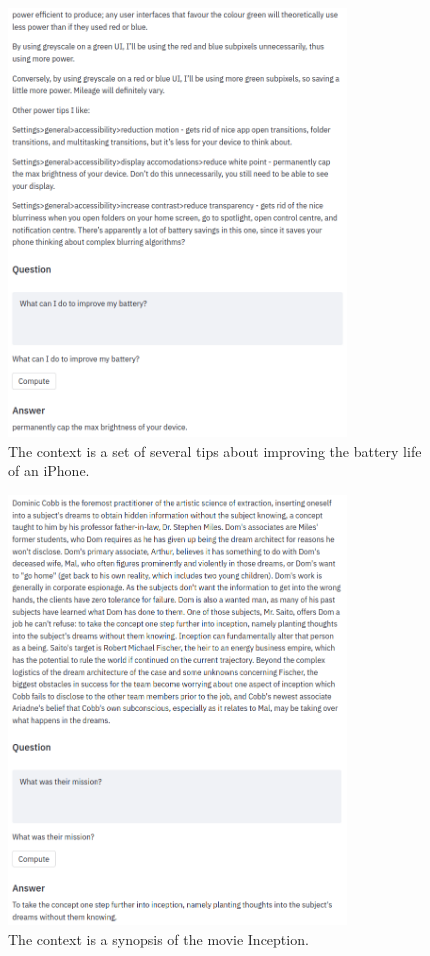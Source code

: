 \documentclass[a4paper, 10pt]{article}
\begin{document}
    \begin{figure}[!htb]
        \centering
        \includegraphics[width=0.8\textwidth]{Figures/battery.png}
        \caption{The context is a set of several tips about improving the battery life of an iPhone.}
    \end{figure}
    
    \begin{figure}[!htb]
        \centering
        \includegraphics[width=0.8\textwidth]{Figures/inception.png}
        \caption{The context is a synopsis of the movie Inception.}
    \end{figure}
    
\end{document}
